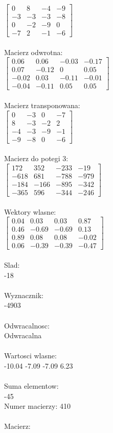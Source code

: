 \documentclass[a4paper,12pt]{article}
\begin{document}
$\begin{bmatrix} 0&8&-4&-9\\-3&-3&-3&-8\\0&-2&-9&0\\-7&2&-1&-6 \end{bmatrix}$
\\
\\
Macierz odwrotna:\\

$\begin{bmatrix} 0.06&0.06&-0.03&-0.17\\0.07&-0.12&0&0.05\\-0.02&0.03&-0.11&-0.01\\-0.04&-0.11&0.05&0.05 \end{bmatrix}$
\\
\\
Macierz transponowana:\\

$\begin{bmatrix} 0&-3&0&-7\\8&-3&-2&2\\-4&-3&-9&-1\\-9&-8&0&-6 \end{bmatrix}$
\\
\\
Macierz do potegi 3:\\

$\begin{bmatrix} 172&352&-233&-19\\-618&681&-788&-979\\-184&-166&-895&-342\\-365&596&-344&-246 \end{bmatrix}$
\\
\\
Wektory wlasne:\\

$\begin{bmatrix} 0.04&0.03&0.03&0.87\\0.46&-0.69&-0.69&0.13\\0.89&0.08&0.08&-0.02\\0.06&-0.39&-0.39&-0.47 \end{bmatrix}$
\\
\\
Slad:\\
-18
\\
\\
Wyznacznik:\\
-4903
\\
\\
Odwracalnosc:\\
Odwracalna
\\
\\
Wartosci wlasne:\\
-10.04 -7.09 -7.09 6.23
\\
\\
Suma elementow:\\
-45
\\
\newpage
Numer macierzy:
410
\\
\\
Macierz:\\
\end{document}
